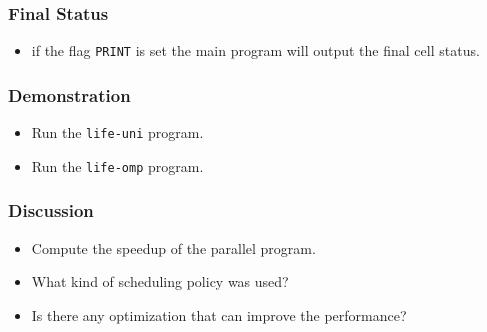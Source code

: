 \documentclass{beamer}
\begin{document}
\begin{frame}
\end{frame}

\begin{frame}
\frametitle{Final Status}
\begin{itemize}
\item if the flag {\tt PRINT} is set the main program will output the
  final cell status.
\end{itemize}
\end{frame}

\begin{frame}
\end{frame}

\begin{frame}
  \frametitle{Demonstration}
  \begin{itemize}
  \item Run the {\tt life-uni} program.
  \item Run the {\tt life-omp} program.
  \end{itemize}
\end{frame}

\begin{frame}
  \frametitle{Discussion}
  \begin{itemize}
  \item Compute the speedup of the parallel program.
  \item What kind of scheduling policy was used?
  \item Is there any optimization that can improve the performance?
  \end{itemize}
\end{frame}


\end{document}
